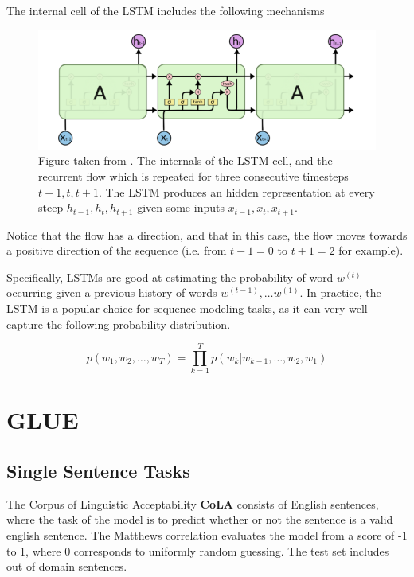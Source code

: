 \documentclass[a4paper,12pt,oneside,openright]{report}
\begin{document}
The internal cell of the LSTM includes the following mechanisms

\begin{figure}[h]
	\center
  \includegraphics[width=\linewidth]{./assets/background/LSTM.png}
  \caption{Figure taken from \cite{colahLSTM}. The internals of the LSTM cell, and the recurrent flow which is repeated for three consecutive timesteps $t-1, t, t+1$. 
  The LSTM produces an hidden representation at every steep $h_{t-1}, h_{t}, h_{t+1}$ given some inputs $x_{t-1}, x_t, x_{t+1}$.
  }
  \label{fig:lstm_internals}
\end{figure}

Notice that the flow has a direction, and that in this case, the flow moves towards a positive direction of the sequence (i.e. from $t-1 = 0$ to $t + 1 = 2$ for example).

Specifically, LSTMs \cite{hochreiter97} are good at estimating the probability of word $w^{(t)}$ occurring given a previous history of words $w^{(t-1)}, \ldots w^{(1)}$.
In practice, the LSTM is a popular choice for sequence modeling tasks, as it can very well capture the following probability distribution.

\begin{equation}
p\left(w_{1},  w_{2}, \ldots, w_{T} \right)=\prod_{k=1}^{T} p\left(w_{k} | w_{k-1}, \ldots, w_{2}, w_{1}\right)
\end{equation}

\section{GLUE}\label{appendix:GLUE}

\subsection{Single Sentence Tasks}

The Corpus of Linguistic Acceptability \textbf{CoLA} \cite{warstadt2018} consists of English sentences, where the task of the model is to predict whether or not the sentence is a valid english sentence.
The Matthews correlation evaluates the model from a score of -1 to 1, where 0 corresponds to uniformly random guessing.
The test set includes out of domain sentences. \\
\end{document}
